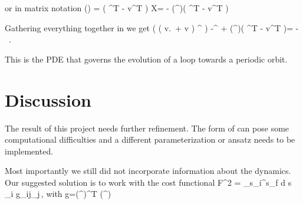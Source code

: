 or in matrix notation
 \beq
 	\fp{}{\tau}\left(\right) =
	\left( ^T   - v^T  \right)
 \eeq
 \beq
 	X= - \left(^{\perp}\right)\left( ^T   - v^T  \right)
 \eeq

 Gathering everything together in  we get
 \beq
 \left( \left( v.\, 
        + v\otimes{} \right) ^{\perp} 
 	\right) -^{\perp} 
		+
		 \left(^{\perp}\right)\left( ^T   - v^T  \right)= - \, .
	\label{eq:PDE}
 \eeq

 \label{sec:PDE-eucl}

 This is the PDE that governs the evolution of a loop towards a periodic orbit.



\section{Discussion}
\label{sec:sum}

The result of this project needs further refinement. The form of 
can pose some computational difficulties and a different parameterization or
ansatz needs to be implemented.

Most importantly we still did not incorporate information about the dynamics. Our
suggested solution is to work with the cost functional
\beq
  	F^2 = \int_{s_i}^{s_f} d s\,  _i g_{ij}_j\,,
\eeq
with
\beq
	g=\left(\JL {}^{\perp}\right)^T  \left(\JL {}^{\perp}\right)
\eeq

